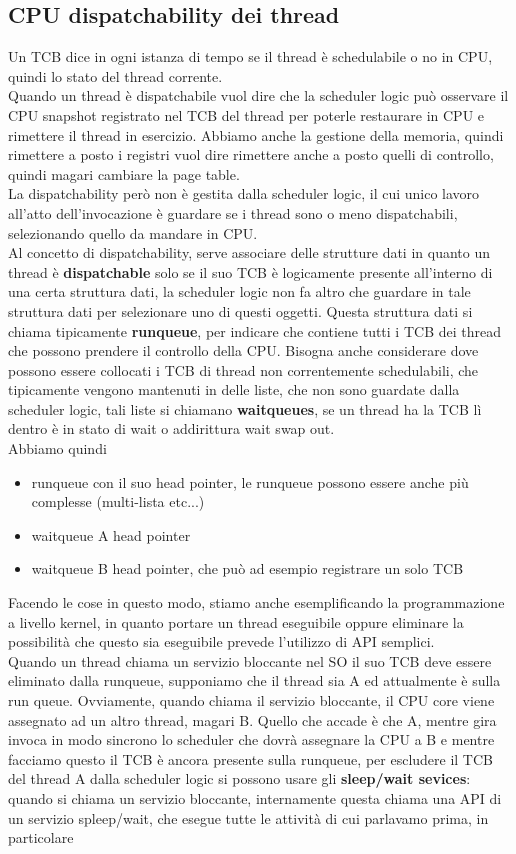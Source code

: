 \documentclass[12pt, oneside]{extbook}
\begin{document}
\subsection{CPU dispatchability dei thread}
Un TCB dice in ogni istanza di tempo se il thread è schedulabile o no in CPU, quindi lo stato del thread corrente.\\Quando un thread è dispatchabile vuol dire che la scheduler logic può osservare il CPU snapshot registrato nel TCB del thread per poterle restaurare in CPU e rimettere il thread in esercizio. Abbiamo anche la gestione della memoria, quindi rimettere a posto i registri vuol dire rimettere anche a posto quelli di controllo, quindi magari cambiare la page table.\\La dispatchability però non è gestita dalla scheduler logic, il cui unico lavoro all'atto dell'invocazione è guardare se i thread sono o meno dispatchabili, selezionando quello da mandare in CPU.\\Al concetto di dispatchability, serve associare delle strutture dati in quanto un thread è \textbf{dispatchable} solo se il suo TCB è logicamente presente all'interno di una certa struttura dati, la scheduler logic non fa altro che guardare in tale struttura dati per selezionare uno di questi oggetti. Questa struttura dati si chiama tipicamente \textbf{runqueue}, per indicare che contiene tutti i TCB dei thread che possono prendere il controllo della CPU. Bisogna anche considerare dove possono essere collocati i TCB di thread non correntemente schedulabili, che tipicamente vengono mantenuti in delle liste, che non sono guardate dalla scheduler logic, tali liste si chiamano \textbf{waitqueues}, se un thread ha la TCB lì dentro è in stato di wait o addirittura wait swap out.\\Abbiamo quindi
\begin{itemize}
\item runqueue con il suo head pointer, le runqueue possono essere anche più complesse (multi-lista etc...)
\item waitqueue A head pointer
\item waitqueue B head pointer, che può ad esempio registrare un solo TCB
\end{itemize}
Facendo le cose in questo modo, stiamo anche esemplificando la programmazione a livello kernel, in quanto portare un thread eseguibile oppure eliminare la possibilità che questo sia eseguibile prevede l'utilizzo di API semplici.\\Quando un thread chiama un servizio bloccante nel SO il suo TCB deve essere eliminato dalla runqueue, supponiamo che il thread sia A ed attualmente è sulla run queue. Ovviamente, quando chiama il servizio bloccante, il CPU core viene assegnato ad un altro thread, magari B. Quello che accade è che A, mentre gira invoca in modo sincrono lo scheduler che dovrà assegnare la CPU a B e mentre facciamo questo il TCB è ancora presente sulla runqueue, per escludere il TCB del thread A dalla scheduler logic si possono usare gli \textbf{sleep/wait sevices}: quando si chiama un servizio bloccante, internamente questa chiama una API di un servizio spleep/wait, che esegue tutte le attività di cui parlavamo prima, in particolare 
\end{document}
